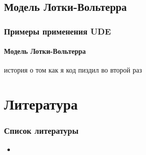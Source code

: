 \documentclass[10pt,pdf,hyperref={unicode}]{beamer}
\begin{document}
			
		\subsection{Модель Лотки-Вольтерра}
			
			\begin{frame}
				\frametitle{Примеры применения UDE} 
				\framesubtitle{Модель Лотки-Вольтерра}
					история о том как я код пиздил  во второй раз
			\end{frame}
		
		
	\section*{Литература}
	
		\begin{frame}
			\frametitle{Список литературы} 
				\begin{itemize}
					\item
				\end{itemize}
			
		\end{frame}
\end{document}
